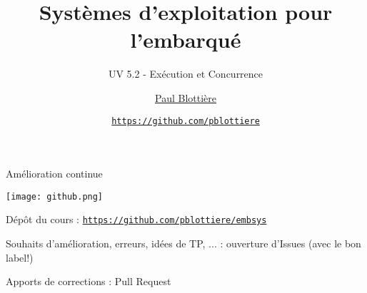 \title{Systèmes d'exploitation pour l'embarqué}
\subtitle{UV 5.2 - Exécution et Concurrence}

\author{\href{}{Paul Blottière}}
\date{
    \href{https://github.com/pblottiere}{\tt \scriptsize https://github.com/pblottiere} \\[2pt]
}



{
\frame{
    \titlepage
} }

\begin{frame}{Amélioration continue}
    \vspace{12pt}

    \begin{center}
    \texttt{[image: github.png]}
    \end{center}

    \bi
    \itemsep12pt
    \item Dépôt du cours : \href{https://github.com/pblottiere/embsys}{\tt \scriptsize https://github.com/pblottiere/embsys}
    \item Souhaits d'amélioration, erreurs, idées de TP, ... : ouverture d'Issues (avec le bon label!)
    \item Apports de corrections : Pull Request
    \ei
\end{frame}


